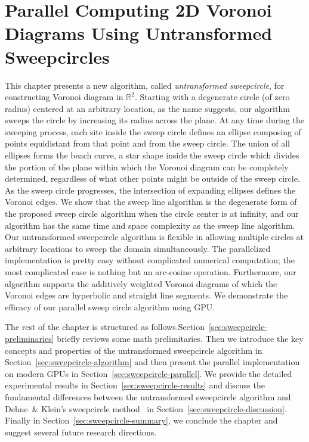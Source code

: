 \chapter{Parallel Computing 2D Voronoi Diagrams Using Untransformed Sweepcircles}

This chapter presents a new algorithm, called {\em
untransformed sweepcircle}, for constructing Voronoi diagram in
$\mathbb{R}^2$. Starting with a degenerate circle (of zero radius)
centered at an arbitrary location, as the name suggests, our
algorithm sweeps the circle by increasing its radius across the
plane. At any time during the sweeping process, each site inside the
sweep circle defines an ellipse composing of points equidistant from
that point and from the sweep circle. The union of all ellipses
forms the beach curve, a star shape inside the sweep circle which
divides the portion of the plane within which the Voronoi diagram
can be completely determined, regardless of what other points might
be outside of the sweep circle. As the sweep circle progresses, the
intersection of expanding ellipses defines the Voronoi edges. We
show that the sweep line algorithm is the degenerate form of the
proposed sweep circle algorithm when the circle center is at
infinity, and our algorithm has the same time and space complexity
as the sweep line algorithm. Our untransformed sweepcircle algorithm
is flexible in allowing multiple circles at arbitrary locations to
sweep the domain simultaneously. The parallelized implementation is
pretty easy without complicated numerical computation; the most
complicated case is nothing but an arc-cosine operation.
Furthermore, our algorithm supports the additively weighted Voronoi
diagrams of which the Voronoi edges are hyperbolic and straight line
segments. We demonstrate the efficacy of our parallel sweep circle
algorithm using GPU.


The rest of the chapter is structured as follows.Section~\ref{sec:sweepcircle-preliminaries} briefly reviews some math prelimitaries.
Then we introduce the key concepts and properties of the untransformed sweepcircle algorithm in
Section~\ref{sec:sweepcircle-algorithm} and then present the parallel implementation on modern GPUs in Section~\ref{sec:sweepcircle-parallel}.
We provide the detailed experimental results in Section~\ref{sec:sweepcircle-results} and discuss the fundamental differences between
the untransformed sweepcircle algorithm and Dehne~\& Klein's sweepcircle method~\cite{Dehne_Klein:1987} in Section~\ref{sec:sweepcircle-discussion}.
Finally in Section~\ref{sec:sweepcircle-summary}, we conclude the chapter and suggest several future research directions.

